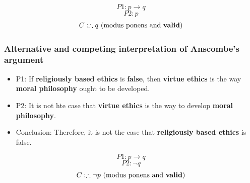 \documentclass[11pt]{article}
\begin{document}
\[P1: p \rightarrow q\]
\[P2: p\]
\[C: \therefore q \ (\text{modus ponens and \textbf{valid}})\]
\subsubsection{Alternative and competing interpretation of Anscombe's argument}
\label{sec:org35aefbc}
\begin{itemize}
\item P1: If \textbf{religiously based ethics} is \textbf{false}, then \textbf{virtue ethics} is the way \textbf{moral philosophy} ought to be developed.
\item P2: It is not hte case that \textbf{virtue ethics} is the way to develop \textbf{moral philosophy}.
\item Conclusion: Therefore, it is not the case that \textbf{religiously based ethics} is false.
\end{itemize}

\[P1: p \rightarrow q\]
\[P2: \neg q\]
\[C: \therefore \neg p \ (\text{modus ponens and \textbf{valid}})\]

 \newpage
\end{document}
